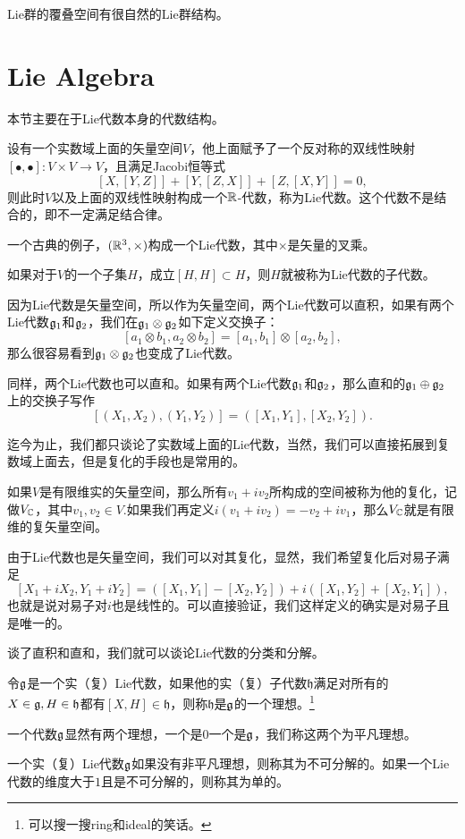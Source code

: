 \para Lie群的覆叠空间有很自然的Lie群结构。

\section{Lie Algebra}

本节主要在于Lie代数本身的代数结构。

\para 设有一个实数域上面的矢量空间$V$，他上面赋予了一个反对称的双线性映射$[\bullet,\bullet]:V\times V\to V$，且满足Jacobi恒等式
\[
[X,[Y,Z]]+[Y,[Z,X]]+[Z,[X,Y]]=0,
\]
则此时$V$以及上面的双线性映射构成一个$\mathbb{R}$-代数，称为Lie代数。这个代数不是结合的，即不一定满足结合律。

一个古典的例子，$(\mathbb{R}^3,\times)$构成一个Lie代数，其中$\times$是矢量的叉乘。

\para 如果对于$V$的一个子集$H$，成立$[H,H]\subset H$，则$H$就被称为Lie代数的子代数。

因为Lie代数是矢量空间，所以作为矢量空间，两个Lie代数可以直积，如果有两个Lie代数${\mathfrak{g}}_1$和${\mathfrak{g}}_2$，我们在${\mathfrak{g}}_1\otimes{\mathfrak{g}}_2$如下定义交换子：
\[
	[a_1\otimes b_1,a_2\otimes b_2]=[a_1,b_1]\otimes [a_2,b_2],
\]
那么很容易看到${\mathfrak{g}}_1\otimes{\mathfrak{g}}_2$也变成了Lie代数。

同样，两个Lie代数也可以直和。如果有两个Lie代数${\mathfrak{g}}_1$和${\mathfrak{g}}_2$，那么直和的${\mathfrak{g}}_1\oplus{\mathfrak{g}}_2$上的交换子写作
\[
	[(X_1,X_2),(Y_1,Y_2)]=([X_1,Y_1],[X_2,Y_2]).
\]

迄今为止，我们都只谈论了实数域上面的Lie代数，当然，我们可以直接拓展到复数域上面去，但是复化的手段也是常用的。

\para 如果$V$是有限维实的矢量空间，那么所有$v_1+iv_2$所构成的空间被称为他的复化，记做$V_{\mathbb{C}}$，其中$v_1,v_2\in V$.如果我们再定义$i(v_1+iv_2)=-v_2+iv_1$，那么$V_{\mathbb{C}}$就是有限维的复矢量空间。

由于Lie代数也是矢量空间，我们可以对其复化，显然，我们希望复化后对易子满足
\[
[X_1+iX_2,Y_1+iY_2]=([X_1,Y_1]-[X_2,Y_2])+i([X_1,Y_2]+[X_2,Y_1]),
\]
也就是说对易子对$i$也是线性的。可以直接验证，我们这样定义的确实是对易子且是唯一的。

谈了直积和直和，我们就可以谈论Lie代数的分类和分解。

\para 令${\mathfrak{g}}$是一个实（复）Lie代数，如果他的实（复）子代数$\mathfrak{h}$满足对所有的$X\in {\mathfrak{g}},H \in \mathfrak{h}$都有$[X,H]\in \mathfrak{h}$，则称$\mathfrak{h}$是${\mathfrak{g}}$的一个理想。\footnote{可以搜一搜ring和ideal的笑话。}

一个代数${\mathfrak{g}}$显然有两个理想，一个是$0$一个是${\mathfrak{g}}$，我们称这两个为平凡理想。

\para 一个实（复）Lie代数${\mathfrak{g}}$如果没有非平凡理想，则称其为不可分解的。如果一个Lie代数的维度大于$1$且是不可分解的，则称其为单的。

